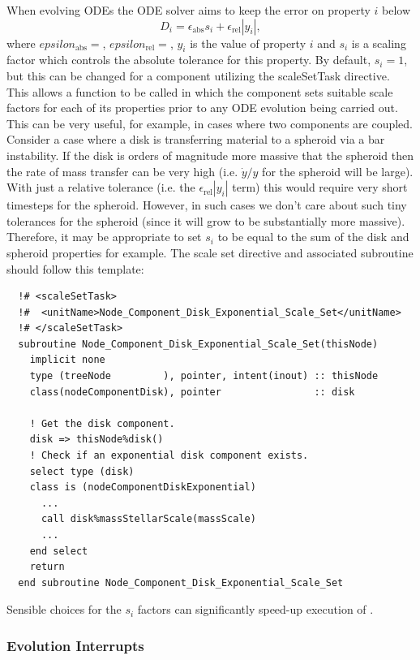 When evolving ODEs the ODE solver aims to keep the error on property $i$ below
\begin{equation}
 D_i = \epsilon_\mathrm{abs} s_i + \epsilon_\mathrm{rel} |y_i|,
\end{equation}
where $epsilon_\mathrm{abs}=${\normalfont \ttfamily [odeToleranceAbsolute]}, $epsilon_\mathrm{rel}=${\normalfont \ttfamily [odeToleranceRelative]}, $y_i$ is the value of property $i$ and $s_i$ is a scaling factor which controls the absolute tolerance for this property. By default, $s_i=1$, but this can be changed for a component utilizing the {\normalfont \ttfamily scaleSetTask} directive. This allows a function to be called in which the component sets suitable scale factors for each of its properties prior to any ODE evolution being carried out. This can be very useful, for example, in cases where two components are coupled. Consider a case where a disk is transferring material to a spheroid via a bar instability. If the disk is orders of magnitude more massive that the spheroid then the rate of mass transfer can be very high (i.e. $\dot{y}/y$ for the spheroid will be large). With just a relative tolerance (i.e. the $\epsilon_\mathrm{rel} |y_i|$ term) this would require very short timesteps for the spheroid. However, in such cases we don't care about such tiny tolerances for the spheroid (since it will grow to be substantially more massive). Therefore, it may be appropriate to set $s_i$ to be equal to the sum of the disk and spheroid properties for example. The scale set directive and associated subroutine should follow this template:
\begin{verbatim}
  !# <scaleSetTask>
  !#  <unitName>Node_Component_Disk_Exponential_Scale_Set</unitName>
  !# </scaleSetTask>
  subroutine Node_Component_Disk_Exponential_Scale_Set(thisNode)
    implicit none
    type (treeNode         ), pointer, intent(inout) :: thisNode
    class(nodeComponentDisk), pointer                :: disk

    ! Get the disk component.
    disk => thisNode%disk()
    ! Check if an exponential disk component exists.
    select type (disk)
    class is (nodeComponentDiskExponential)
      ...
      call disk%massStellarScale(massScale)
      ...
    end select
    return
  end subroutine Node_Component_Disk_Exponential_Scale_Set
\end{verbatim}
Sensible choices for the $s_i$ factors can significantly speed-up execution of \glc.

\subsubsection{Evolution Interrupts}

